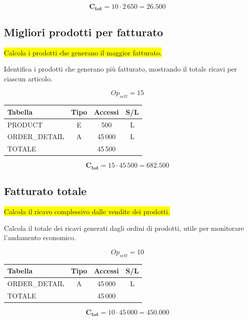 \documentclass[a4paper,12pt]{report}
\begin{document}
$$\mathbf{C_{tot}} = 10 \cdot 2\,650 = \mathbf{26.500}$$

\subsection*{Migliori prodotti per fatturato} \label{op4}
\colorbox{yellow}{Calcola i prodotti che generano il maggior fatturato.}

Identifica i prodotti che generano più fatturato, mostrando il totale
ricavi per ciascun articolo.

$$Op_{sett} = 15$$
\begin{table}[H]
  \centering
  \small
  \renewcommand{\arraystretch}{1.15}
  \begin{tabularx}{0.9\textwidth}{|X|c|c|c|}
    \hline
    \rowcolor{gray!20}
    \textbf{Tabella} & \textbf{Tipo} & \textbf{Accessi} & \textbf{S/L} \\
    \hline
    PRODUCT & E & 500 & L \\
    ORDER\_DETAIL & A & 45\,000 & L \\
    \hline
    \rowcolor{gray!20}
    TOTALE & & 45\,500 & \\
    \hline
  \end{tabularx}
  \vspace{-1em}
\end{table}

$$\mathbf{C_{tot}} = 15 \cdot 45\,500 = \mathbf{682.500}$$

\subsection*{Fatturato totale} \label{op5}
\colorbox{yellow}{Calcola il ricavo complessivo dalle vendite dei prodotti.}

Calcola il totale dei ricavi generati dagli ordini di prodotti, utile
per monitorare l'andamento economico.

$$Op_{sett} = 10$$

\begin{table}[H]
  \centering
  \small
  \renewcommand{\arraystretch}{1.15}
  \begin{tabularx}{0.9\textwidth}{|X|c|c|c|}
    \hline
    \rowcolor{gray!20}
    \textbf{Tabella} & \textbf{Tipo} & \textbf{Accessi} & \textbf{S/L} \\
    \hline
    ORDER\_DETAIL & A & 45\,000 & L \\
    \hline
    \rowcolor{gray!20}
    TOTALE & & 45\,000 & \\
    \hline
  \end{tabularx}
  \vspace{-1em}
\end{table}
$$\mathbf{C_{tot}} = 10 \cdot 45\,000 = \mathbf{450.000}$$
\end{document}
